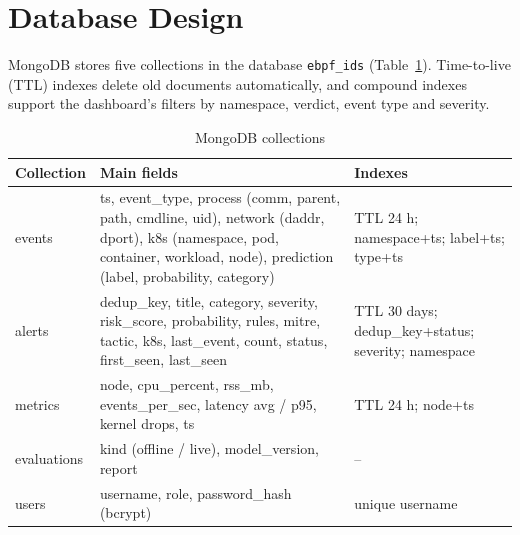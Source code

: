\section{Database Design}

MongoDB stores five collections in the database \texttt{ebpf\_ids}
(Table~\ref{tab:collections}). Time-to-live (TTL) indexes delete old documents
automatically, and compound indexes support the dashboard's filters by namespace,
verdict, event type and severity.

\begin{table}[H]
\centering
\caption{MongoDB collections}
\label{tab:collections}
\small
\begin{tabularx}{\textwidth}{l >{\raggedright\arraybackslash}X >{\raggedright\arraybackslash}p{3.6cm}}
\toprule
\textbf{Collection} & \textbf{Main fields} & \textbf{Indexes} \\
\midrule
events & ts, event\_type, process (comm, parent, path, cmdline, uid), network (daddr, dport), k8s (namespace, pod, container, workload, node), prediction (label, probability, category) & TTL 24 h; namespace+ts; label+ts; type+ts \\
alerts & dedup\_key, title, category, severity, risk\_score, probability, rules, mitre, tactic, k8s, last\_event, count, status, first\_seen, last\_seen & TTL 30 days; dedup\_key+status; severity; namespace \\
metrics & node, cpu\_percent, rss\_mb, events\_per\_sec, latency avg / p95, kernel drops, ts & TTL 24 h; node+ts \\
evaluations & kind (offline / live), model\_version, report & -- \\
users & username, role, password\_hash (bcrypt) & unique username \\
\bottomrule
\end{tabularx}
\end{table}
